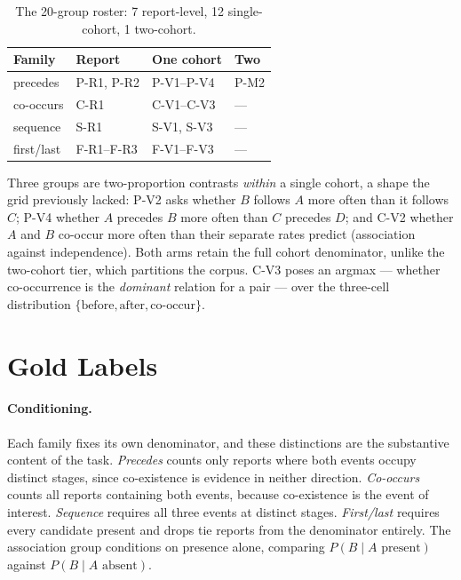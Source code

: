\begin{table}[t]
\centering
\small
\begin{tabular}{llll}
\toprule
Family & Report & One cohort & Two \\
\midrule
precedes & P-R1, P-R2 & P-V1--P-V4 & P-M2 \\
co-occurs & C-R1 & C-V1--C-V3 & --- \\
sequence & S-R1 & S-V1, S-V3 & --- \\
first/last & F-R1--F-R3 & F-V1--F-V3 & --- \\
\bottomrule
\end{tabular}
\caption{The 20-group roster: 7 report-level, 12 single-cohort, 1 two-cohort.}
\label{tab:roster}
\end{table}

Three groups are two-proportion contrasts \emph{within} a single cohort, a shape
the grid previously lacked: P-V2 asks whether $B$ follows $A$ more often than it
follows $C$; P-V4 whether $A$ precedes $B$ more often than $C$ precedes $D$; and
C-V2 whether $A$ and $B$ co-occur more often than their separate rates predict
(association against independence). Both arms retain the full cohort
denominator, unlike the two-cohort tier, which partitions the corpus. C-V3 poses
an argmax --- whether co-occurrence is the \emph{dominant} relation for a pair
--- over the three-cell distribution $\{\textrm{before}, \textrm{after},
\textrm{co-occur}\}$.

\section{Gold Labels}
\label{sec:gold}

\paragraph{Conditioning.} Each family fixes its own denominator, and these
distinctions are the substantive content of the task. \emph{Precedes} counts only
reports where both events occupy distinct stages, since co-existence is evidence
in neither direction. \emph{Co-occurs} counts all reports containing both events,
because co-existence is the event of interest. \emph{Sequence} requires all three
events at distinct stages. \emph{First/last} requires every candidate present and
drops tie reports from the denominator entirely. The association group conditions
on presence alone, comparing $P(B \mid A \textrm{ present})$ against $P(B \mid A
\textrm{ absent})$.

